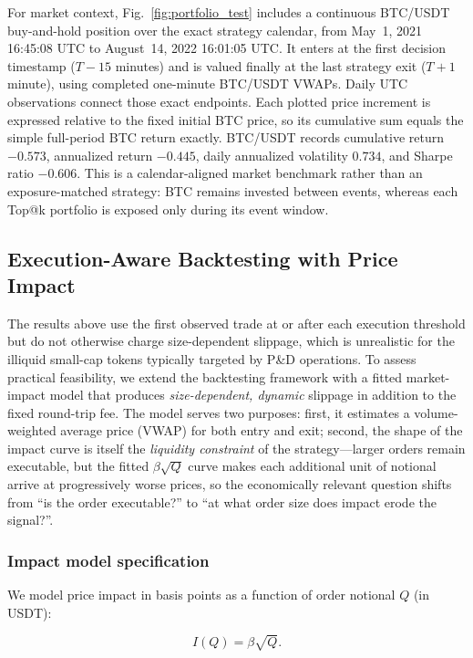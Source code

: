 \documentclass{ieeeaccess}
\begin{document}
For market context, Fig.~\ref{fig:portfolio_test} includes a continuous BTC/USDT buy-and-hold position over the exact strategy calendar, from May~1, 2021 16:45:08 UTC to August~14, 2022 16:01:05 UTC. It enters at the first decision timestamp ($T-15$ minutes) and is valued finally at the last strategy exit ($T+1$ minute), using completed one-minute BTC/USDT VWAPs. Daily UTC observations connect those exact endpoints. Each plotted price increment is expressed relative to the fixed initial BTC price, so its cumulative sum equals the simple full-period BTC return exactly. BTC/USDT records cumulative return $-0.573$, annualized return $-0.445$, daily annualized volatility $0.734$, and Sharpe ratio $-0.606$. This is a calendar-aligned market benchmark rather than an exposure-matched strategy: BTC remains invested between events, whereas each Top@k portfolio is exposed only during its event window.

\subsection{Execution-Aware Backtesting with Price Impact}
\label{sec:price_impact}

The results above use the first observed trade at or after each execution threshold but do not otherwise charge size-dependent slippage, which is unrealistic for the illiquid small-cap tokens typically targeted by P\&D operations. To assess practical feasibility, we extend the backtesting framework with a fitted market-impact model that produces \emph{size-dependent, dynamic} slippage in addition to the fixed round-trip fee. The model serves two purposes: first, it estimates a volume-weighted average price (VWAP) for both entry and exit; second, the shape of the impact curve is itself the \emph{liquidity constraint} of the strategy---larger orders remain executable, but the fitted $\beta\sqrt{Q}$ curve makes each additional unit of notional arrive at progressively worse prices, so the economically relevant question shifts from ``is the order executable?'' to ``at what order size does impact erode the signal?''.

\subsubsection{Impact model specification}
We model price impact in basis points as a function of order notional $Q$ (in USDT):

\begin{equation}
    I(Q) = \beta \sqrt{Q}.
    \label{eq:impact_model}
\end{equation}
\end{document}
